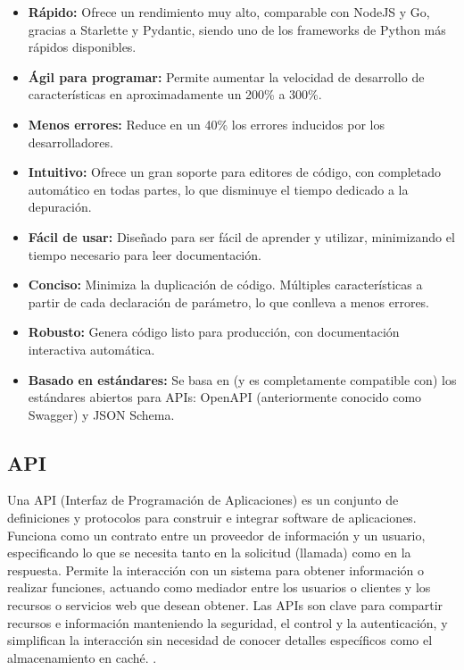 \begin{itemize}
    \item \textbf{Rápido:} Ofrece un rendimiento muy alto, comparable con NodeJS
      y Go, gracias a Starlette y Pydantic, siendo uno de los frameworks de Python
      más rápidos disponibles.
    \item \textbf{Ágil para programar:} Permite aumentar la velocidad de desarrollo
      de características en aproximadamente un 200\% a 300\%.
    \item \textbf{Menos errores:} Reduce en un 40\% los errores inducidos por los
      desarrolladores.
    \item \textbf{Intuitivo:} Ofrece un gran soporte para editores de código, con
      completado automático en todas partes, lo que disminuye el tiempo dedicado
      a la depuración.
    \item \textbf{Fácil de usar:} Diseñado para ser fácil de aprender y utilizar,
      minimizando el tiempo necesario para leer documentación.
    \item \textbf{Conciso:} Minimiza la duplicación de código. Múltiples
      características a partir de cada declaración de parámetro, lo que conlleva
      a menos errores.
    \item \textbf{Robusto:} Genera código listo para producción, con documentación
      interactiva automática.
    \item \textbf{Basado en estándares:} Se basa en (y es completamente compatible
      con) los estándares abiertos para APIs: OpenAPI (anteriormente conocido
      como Swagger) y JSON Schema.
\end{itemize}

\subsection{API}

Una API (Interfaz de Programación de Aplicaciones) es un conjunto de definiciones
y protocolos para construir e integrar software de aplicaciones. Funciona
como un contrato entre un proveedor de información y un usuario, especificando
lo que se necesita tanto en la solicitud (llamada) como en la respuesta. Permite
la interacción con un sistema para obtener información o realizar funciones,
actuando como mediador entre los usuarios o clientes y los recursos o servicios
web que desean obtener. Las APIs son clave para compartir recursos e información
manteniendo la seguridad, el control y la autenticación, y simplifican la
interacción sin necesidad de conocer detalles específicos como el almacenamiento
en caché. \cite{Red_Hat_REST_API}.


